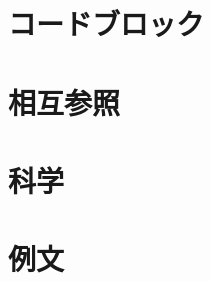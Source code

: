 \documentclass{jlreq}
\begin{document}
\part{コードブロック}



\part{相互参照}


\part{科学}




\part{例文}


\end{document}
